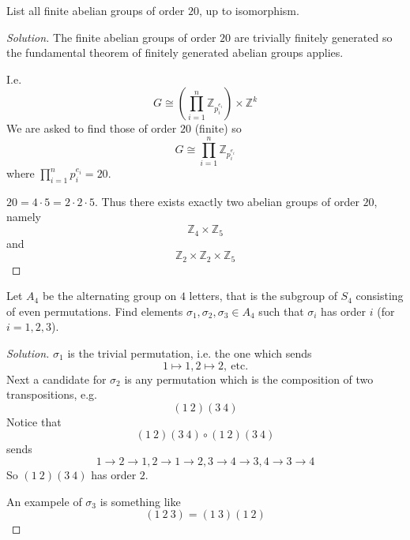 \begin{prob}
    List all finite abelian groups of order $20$, up to isomorphism.
\end{prob}
\begin{proof}[Solution]
    The finite abelian groups of order $20$ are trivially 
    finitely generated so the fundamental theorem of finitely 
    generated abelian groups applies. 

    I.e. 
    \[
        G \cong \left(\prod_{i=1}^n 
        \mathbb Z_{p_i^{e_i}}\right) \times 
        \mathbb Z^k
    \]
    We are asked to find those of order $20$ (finite) so 
    \[
        G \cong \prod_{i=1}^n \mathbb Z_{p_i^{e_i}}
    \]
    where $\prod_{i=1}^n p_i^{e_i} = 20$. 

    $20 = 4\cdot5 = 2\cdot2\cdot 5$. Thus there exists exactly 
    two abelian groups of order $20$, namely 
    \[
        \mathbb Z_4 \times \mathbb Z_5
    \]
    and
    \[
        \mathbb Z_2 \times \mathbb Z_2 \times \mathbb Z_5
    \]
\end{proof}
\begin{prob}
    Let $A_4$ be the alternating group on $4$ letters, that is 
    the subgroup of $S_4$ consisting of even permutations. 
    Find elements $\sigma_1,\sigma_2,\sigma_3 \in A_4$ such that 
    $\sigma_i$ has order $i$ (for $i = 1,2,3$). 
\end{prob}
\begin{proof}[Solution]
    $\sigma_1$ is the trivial permutation, i.e. the one which sends 
    \[
        1 \mapsto 1, 2 \mapsto 2, \ \text{etc.}
    \]
    Next a candidate for $\sigma_2$ is any permutation which is 
    the composition of two transpositions, e.g. 
    \[
        (1 \ 2)(3 \ 4)
    \]
    Notice that 
    \[
        (1 \ 2)(3 \ 4) \circ (1 \ 2)(3 \ 4) 
    \]
    sends 
    \[
        1 \to 2 \to 1, 2 \to 1 \to 2, 3 \to 4 \to 3, 4 \to 3 \to 4
    \]
    So $(1 \ 2)(3 \ 4)$ has order $2$. 

    An exampele of $\sigma_3$ is something like  
    \[
        (1 \ 2 \ 3) = (1 \ 3)(1 \ 2)
    \]
\end{proof}

